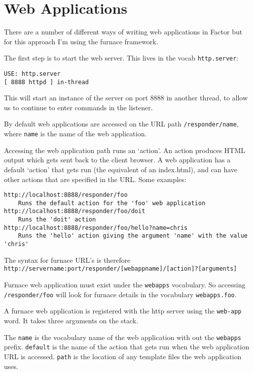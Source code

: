 \chapter{Web Applications}\label{webapps}

There are a number of different ways of writing web applications in
Factor but for this approach I'm using the furnace framework.

The first step is to start the web server. This lives in the vocab \texttt{http.server}:
\begin{verbatim}
USE: http.server
[ 8888 httpd ] in-thread
\end{verbatim}

This will start an instance of the server on port 8888 in another
thread, to allow us to continue to enter commands in the listener.

By default web applications are accessed on the URL path
\texttt{/responder/name}, where \texttt{name} is the name of the web application.

Accessing the web application path runs an `action'. An action
produces HTML output which gets sent back to the client browser. A web
application has a default `action' that gets run (the equivalent of an
index.html), and can have other actions that are specified in the
URL. Some examples:
\begin{verbatim}
http://localhost:8888/responder/foo
    Runs the default action for the 'foo' web application
http://localhost:8888/responder/foo/doit
    Runs the 'doit' action
http://localhost:8888/responder/foo/hello?name=chris
    Runs the 'hello' action giving the argument 'name' with the value 'chris'
\end{verbatim}

The syntax for furnace URL's is therefore
\texttt{http://servername:port/responder/[webappname]/[action]?[arguments]}

Furnace web application must exist under the \texttt{webapps} vocabulary. So
accessing \texttt{/responder/foo} will look for furnace details in the
vocabulary \texttt{webapps.foo}.

A furnace web application is registered with the http server using the
\verb|web-app| word. It takes three arguments on the stack.


The \texttt{name} is the vocabulary name of the web application with
out the \texttt{webapps} prefix. \texttt{default} is the name of the
action that gets run when the web application URL is
accessed. \texttt{path} is the location of any template files the web
application uses.

